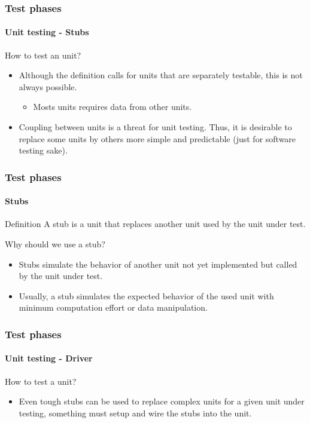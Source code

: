 \begin{frame}
\frametitle{Test phases}
\framesubtitle{Unit testing - Stubs}

\begin{block:fact}{How to test an unit?}
\begin{itemize}
	\item Although the definition calls for units that are separately testable,
	this is not always possible.
	\begin{itemize}
		\item Mosts units requires data from other units.
	\end{itemize}

	\item Coupling between units is a threat for unit testing. Thus, it is
	desirable to replace some units by others more simple and predictable
	(just for software testing sake).
\end{itemize}
\end{block:fact}
\end{frame}



\begin{frame}
\frametitle{Test phases}
\framesubtitle{Stubs}
\label{concept:stub}

\begin{block:concept}{Definition}
A stub is a unit that replaces another unit used by the unit under test.
\end{block:concept}

\begin{block:fact}{Why should we use a stub?}
\begin{itemize}
	\item Stubs simulate the behavior of another unit not yet implemented but
	called by the unit under test.

	\item Usually, a stub simulates the expected behavior of the used unit with
	minimum computation effort or data manipulation.
\end{itemize}
\end{block:fact}

\hfill
{}
\end{frame}


\begin{frame}
\frametitle{Test phases}
\framesubtitle{Unit testing - Driver}

\begin{block:fact}{How to test a unit?}
\begin{itemize}
	\item Even tough stubs can be used to replace complex units for a given
	unit under testing, something must setup and wire the stubs into the
	unit.
\end{itemize}
\end{block:fact}
\end{frame}



